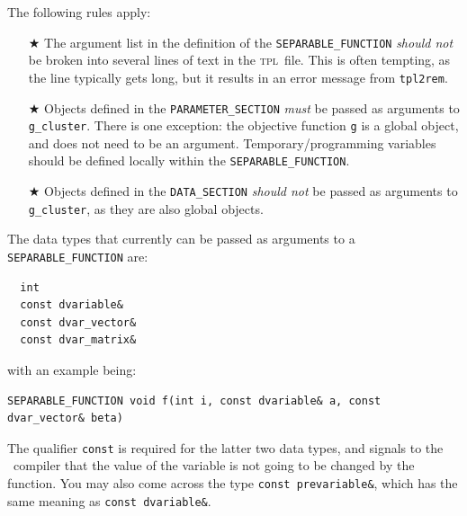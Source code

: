 \documentclass{admbmanual}
\begin{document}
The following rules apply:
\begin{itemize}
  \item[$\bigstar$] The argument list in the definition of the
  \texttt{SEPARABLE\_FUNCTION} \textit{should not} be broken into several lines
  of text in the \textsc{tpl}~file. This is often tempting, as the line
  typically gets long, but it results in an error message from \texttt{tpl2rem}.

  \item[$\bigstar$] Objects defined in the \texttt{PARAMETER\_SECTION}
  \textit{must} be passed as arguments to \texttt{g\_cluster}. There is one
  exception: the objective function \texttt{g} is a global object, and does not
  need to be an argument. Temporary/programming variables should be defined
  locally within the \texttt{SEPARABLE\_FUNCTION}.

  \item[$\bigstar$] Objects defined in the \texttt{DATA\_SECTION} \textit{should
    not} be passed as arguments to \texttt{g\_cluster}, as they are also global
  objects.
\end{itemize}
The data types that currently can be passed as arguments to a
\texttt{SEPARABLE\_FUNCTION} are:
\begin{lstlisting}
  int
  const dvariable&
  const dvar_vector&
  const dvar_matrix&
\end{lstlisting}
with an example being:
\begin{lstlisting}
SEPARABLE_FUNCTION void f(int i, const dvariable& a, const dvar_vector& beta)
\end{lstlisting}
The qualifier \texttt{const} is required for the latter two data types, and
signals to the \cplus~compiler that the value of the variable is not going to be
changed by the function. You may also come across the type \texttt{const
  prevariable\&}, which has the same meaning as \texttt{const dvariable\&}.
\end{document}
